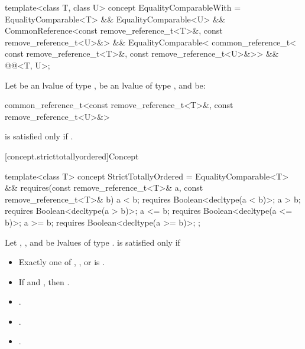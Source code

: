 %
\begin{itemdecl}
template<class T, class U>
  concept EqualityComparableWith =
    EqualityComparable<T> && EqualityComparable<U> &&
    CommonReference<const remove_reference_t<T>&, const remove_reference_t<U>&> &&
    EqualityComparable<
      common_reference_t<
        const remove_reference_t<T>&,
        const remove_reference_t<U>&>> &&
    @@<T, U>;
\end{itemdecl}

\begin{itemdescr}
\pnum
Let  be an lvalue of type ,
 be an lvalue of type ,
and  be:
\begin{codeblock}
common_reference_t<const remove_reference_t<T>&, const remove_reference_t<U>&>
\end{codeblock}
 is satisfied only if
.
\end{itemdescr}

[concept.stricttotallyordered]{Concept }

%
\begin{itemdecl}
template<class T>
  concept StrictTotallyOrdered =
    EqualityComparable<T> &&
    requires(const remove_reference_t<T>& a,
             const remove_reference_t<T>& b) {
      a <  b; requires Boolean<decltype(a <  b)>;
      a >  b; requires Boolean<decltype(a >  b)>;
      a <= b; requires Boolean<decltype(a <= b)>;
      a >= b; requires Boolean<decltype(a >= b)>;
    };
\end{itemdecl}

\begin{itemdescr}
\pnum
Let , , and  be lvalues of type
.
 is satisfied only if

\begin{itemize}
\item Exactly one of , , or
       is .
\item If  and , then
      .
\item {}.
\item {}.
\item {}.
\end{itemize}

\end{itemdescr}


